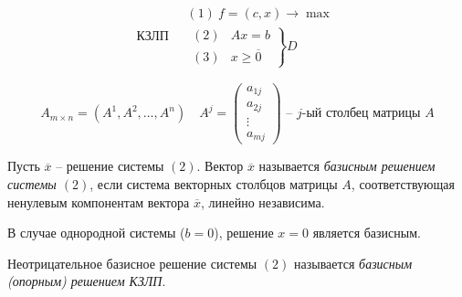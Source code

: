 \[
	\text{КЗЛП} \quad \begin{array}{l}
		(1) \ f =  (c,x) \rightarrow \max \\
		\left.\begin{array}{ll}
			      (2) & Ax = b                   \\
			      (3) & x \geqslant \overline{0}
		      \end{array}\right\} D
	\end{array}
\]

\[
	A_{m \times n} = (A^1,A^2,\ldots ,A^n) \quad A^j = \left(\begin{array}{c}
			a_{1j} \\ a_{2j} \\ \vdots \\ a_{mj}
		\end{array}\right) \text{ -- }j \text{-ый столбец матрицы }A
\]

\begin{definition}
	Пусть $\overline{x} $ -- решение системы $(2)$. Вектор $\overline{x}$ называется \emph{базисным решением системы $(2)$}, если система векторных столбцов матрицы $A$, соответствующая ненулевым компонентам вектора $\overline{x} $, линейно независима.
\end{definition}

\begin{remark}
	В случае однородной системы ($b=0$), решение $x=0$ является базисным.
\end{remark}

\begin{definition}
	Неотрицательное базисное решение системы $(2)$ называется \emph{базисным (опорным) решением КЗЛП}.
\end{definition}

